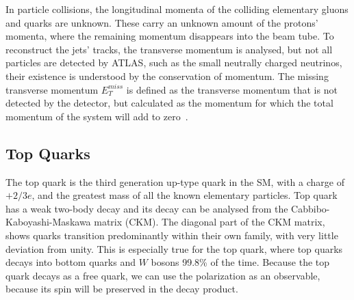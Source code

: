 \documentclass[12pt,a4paper]{article}
\numberwithin{equation}{section}
\begin{document}
In particle collisions, the longitudinal momenta of the colliding elementary
gluons and quarks are unknown. These carry an unknown amount of the protons'
momenta, where the remaining momentum disappears into the beam tube. To
reconstruct the jets' tracks, the transverse momentum is analysed, but not all
particles are detected by ATLAS, such as the small neutrally charged neutrinos,
their existence is understood by the conservation of momentum. The missing
transverse momentum $E_T^{miss}$ is defined as the transverse momentum that is
not detected by the detector, but calculated as the momentum for which the total
momentum of the system will add to zero~\cite{xabier}.

\subsection{Top Quarks}
The top quark is the third generation up-type quark in the SM, with a charge of
$+2/3 e$, and the greatest mass of all the known elementary particles. Top quark
has a weak two-body decay and its decay can be analysed from the
Cabbibo-Kaboyashi-Maskawa matrix (CKM). The diagonal part of the CKM matrix,
shows quarks transition predominantly within their own family, with very little
deviation from unity. This is especially true for the top quark, where top
quarks decays into bottom quarks and $W$ bosons 99.8\% of the time. Because the
top quark decays as a free quark, we can use the polarization as an observable,
because its spin will be preserved in the decay product.\\
\end{document}
